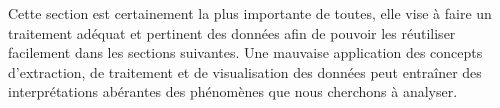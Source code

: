 Cette section est certainement la plus importante de toutes, elle vise à faire un traitement adéquat et pertinent des données afin de pouvoir les réutiliser facilement dans les sections suivantes. Une mauvaise application des concepts d’extraction, de traitement et de visualisation des données peut entraîner des interprétations abérantes des phénomènes que nous cherchons à analyser.



